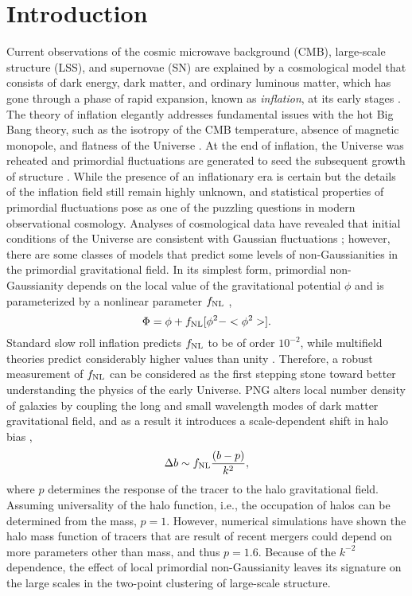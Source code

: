 \section{Introduction}
\label{sec:introduction}
Current observations of the cosmic microwave background (CMB), large-scale structure (LSS), and supernovae (SN) are explained by a cosmological model that consists of dark energy, dark matter, and ordinary luminous matter, which has gone through a phase of rapid expansion, known as \textit{inflation},  at its early stages \citep[see, e.g.,][]{weinberg2013observational}. The theory of inflation elegantly addresses fundamental issues with the hot Big Bang theory, such as the isotropy of the CMB temperature, absence of magnetic monopole, and flatness of the Universe \citep[see, e.g.,][]{weinberg2008cosmology}. At the end of inflation, the Universe was reheated and primordial fluctuations are generated to seed the subsequent growth of structure \citep{kofman1994reheating, bassett2006inflation, lyth2009primordial}. While the presence of an inflationary era is certain but the details of the inflation field still remain highly unknown, and statistical properties of primordial fluctuations pose as one of the puzzling questions in modern observational cosmology. Analyses of cosmological data have revealed that initial conditions of the Universe are consistent with Gaussian fluctuations \citep{guth2005inflationary}; however, there are some classes of models that predict some levels of non-Gaussianities in the primordial gravitational field. In its simplest form, primordial non-Gaussianity depends on the local value of the gravitational potential $\phi$ and is parameterized by a nonlinear parameter $f_{\rm NL}$ \citep{komatsu2001acoustic},
\begin{equation}
    \Phi = \phi + f_{\rm NL} [\phi^{2} -  <\phi^{2}>].
\end{equation}
Standard slow roll inflation predicts $f_{\rm NL}$ to be of order $10^{-2}$, while multifield theories predict considerably higher values than unity \citep[see, e.g.,][]{de2017next}. Therefore, a robust measurement of $f_{\rm NL}$ can be considered as the first stepping stone toward better understanding the physics of the early Universe.  PNG alters local number density of galaxies by coupling the long and small wavelength modes of dark matter gravitational field, and as a result it introduces a scale-dependent shift in halo bias \citep[see, e.g.,][]{dalal2008imprints, slosar2008constraints},
\begin{equation}\label{eq:db}
\Delta b \sim f_{\rm NL} \frac{(b - p)}{k^{2}},
\end{equation}
where $p$ determines the response of the tracer to the halo gravitational field. Assuming universality of the halo function, i.e., the occupation of halos can be determined from the mass, $p=1$. However, numerical simulations have shown the halo mass function of tracers that are result of recent mergers could depend on more parameters other than mass, and thus $p=1.6$.  Because of the $k^{-2}$ dependence, the effect of local primordial non-Gaussianity leaves its signature on the large scales in the two-point clustering of large-scale structure. 

